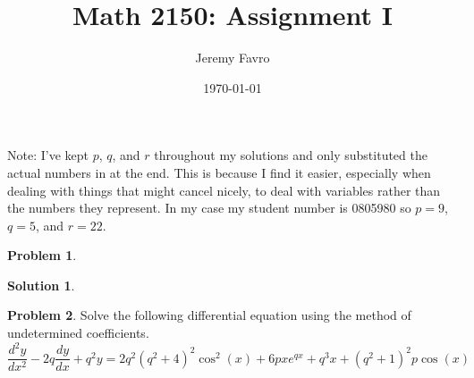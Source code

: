 \documentclass[10pt]{article}
\title{Math 2150: Assignment I}
\author{Jeremy Favro}
\date{\today}
\theoremstyle{definition}
\newtheorem{problem}{Problem}
\newtheorem{soln}{Solution}
\begin{document}
\maketitle
\noindent Note: I've kept $p$, $q$, and $r$ throughout my solutions and only substituted the actual numbers in at the end. This is because I find it easier,
especially when dealing with things that might cancel nicely, to deal with variables rather than the numbers they represent. In my case my
student number is 0805980 so $p=9$, $q=5$, and $r=22$.
\\
\begin{problem}
\end{problem}
\begin{soln}
\end{soln}
\newpage

\begin{problem}
Solve the following differential equation using the method of undetermined coefficients.
$$\frac{d^2y}{dx^2}-2q\frac{dy}{dx}+q^2y=2q^2\left(q^2+4\right)^2\cos^2\left(x\right)+6pxe^{qx}+q^3x+(q^2+1)^2p\cos\left(x\right)$$
\end{problem}
\end{document}

